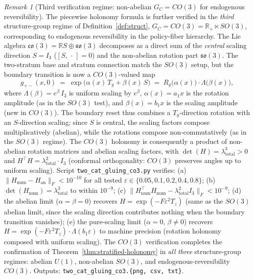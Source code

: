 \documentclass[11pt,a4paper]{article}
\theoremstyle{plain}
\theoremstyle{definition}
\theoremstyle{remark}
\newtheorem{remark}[theorem]{Remark}
\begin{document}
\begin{remark}[Third verification regime: non-abelian $G_C = CO(3)$ for
endogenous reversibility]
\label{rem:2cat-gluing-co3}
The piecewise holonomy formula is further verified in the \emph{third}
structure-group regime of Definition~\ref{def:struct}, $G_C = CO(3)
= \mathbb{R}_+ \ltimes SO(3)$, corresponding to endogenous reversibility
in the policy-fiber hierarchy. The Lie algebra $\mathfrak{co}(3) =
\mathbb{R} S \oplus \mathfrak{so}(3)$ decomposes as a direct sum of the
\emph{central} scaling direction $S = I_3$ ($[S, \,\cdot\,] = 0$) and the
non-abelian rotation part $\mathfrak{so}(3)$. The two-stratum base and
stratum connection match the $SO(3)$ setup, but the boundary transition
is now a $CO(3)$-valued map
\begin{equation}\label{eq:co3-transition}
  g_{+-}(x, 0) \;=\; \exp\bigl(\alpha(x)\,T_y + \beta(x)\,S\bigr)
  \;=\; R_y\bigl(\alpha(x)\bigr) \cdot \Lambda\bigl(\beta(x)\bigr),
\end{equation}
where $\Lambda(\beta) = e^{\beta}\,I_3$ is uniform scaling by $e^{\beta}$,
$\alpha(x) = a_1 x$ is the rotation amplitude (as in the $SO(3)$ test),
and $\beta(x) = b_1 x$ is the scaling amplitude (new in $CO(3)$). The
boundary reset thus combines a $T_y$-direction rotation with an $S$-direction
scaling; since $S$ is central, the scaling factors compose multiplicatively
(abelian), while the rotations compose non-commutatively (as in the $SO(3)$
regime). The $CO(3)$ holonomy is consequently a product of non-abelian
rotation matrices and abelian scaling factors, with $\det(H) =
\lambda_{\mathrm{total}}^3 > 0$ and $H^\top H = \lambda_{\mathrm{total}}^2
\cdot I_3$ (conformal orthogonality: $CO(3)$ preserves angles up to uniform
scaling). Script \texttt{two\_cat\_gluing\_co3.py} verifies: (a)
$\|H_{\mathrm{num}} - H_{\mathrm{an}}\|_F < 10^{-10}$ for all tested
$\varepsilon \in \{0.05, 0.1, 0.2, 0.4, 0.8\}$; (b)
$\det(H_{\mathrm{num}}) = \lambda_{\mathrm{total}}^3$ to within $10^{-9}$;
(c) $\|H_{\mathrm{num}}^\top H_{\mathrm{num}} -
\lambda_{\mathrm{total}}^2 I_3\|_F < 10^{-9}$; (d) the abelian limit
($\alpha = \beta = 0$) recovers $H = \exp(-F\varepsilon^2 T_z)$ (same
as the $SO(3)$ abelian limit, since the scaling direction contributes
nothing when the boundary transition vanishes); (e) the pure-scaling
limit ($\alpha = 0$, $\beta \neq 0$) recovers $H =
\exp(-F\varepsilon^2 T_z) \cdot \Lambda(b_1 \varepsilon)$ to machine
precision (rotation holonomy composed with uniform scaling). The $CO(3)$
verification completes the confirmation of
Theorem~\ref{thm:stratified-holonomy} in
\emph{all three} structure-group regimes: abelian $U(1)$, non-abelian $SO(3)$,
and endogenous-reversibility $CO(3)$. Outputs:
\texttt{two\_cat\_gluing\_co3.\{png, csv, txt\}}.
\end{remark}
\end{document}

